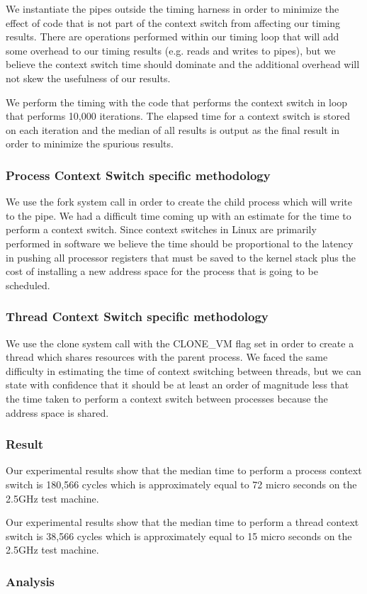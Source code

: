 We instantiate the pipes outside the timing harness in order to minimize the effect
of code that is not part of the context switch from affecting our timing
results. There are operations performed within our timing loop that will add
some overhead to our timing results (e.g. reads and writes to pipes), but we
believe the context switch time should dominate and the additional overhead will
not skew the usefulness of our results.

We perform the timing with the code that performs the context switch in loop
that performs 10,000 iterations. The elapsed time for a context switch is stored
on each iteration and the median of all results is output as the final result in
order to minimize the spurious results.

\subsubsection{Process Context Switch specific methodology} 
We use the fork system call in order to create the child process which will
write to the pipe. We had a difficult time coming up with an estimate for the
time to perform a context switch. Since context switches in Linux are primarily
performed in software we believe the time should be proportional to the latency
in pushing all processor registers that must be saved to the kernel stack plus
the cost of installing a new address space for the process that is going to be
scheduled.
\subsubsection{Thread Context Switch specific methodology}
We use the clone system call with the CLONE\_VM flag set in order to create a
thread which shares resources with the parent process. We faced the same
difficulty in estimating the time of context switching between threads, but we
can state with confidence that it should be at least an order of magnitude less
that the time taken to perform a context switch between processes because the
address space is shared.
\subsubsection{Result}

Our experimental results show that the median time to perform a process context
switch is 180,566 cycles which is approximately equal to 72 micro seconds on the
2.5GHz test machine. 


Our experimental results show that the median time to perform a thread context
switch is 38,566 cycles which is approximately equal to 15 micro seconds on the
2.5GHz test machine.

\subsubsection{Analysis}


